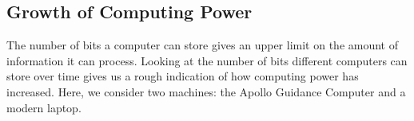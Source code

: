 
\subsection{Growth of Computing Power}\label{sec:growthofcomputing}


The number of bits a computer can store gives an upper limit on the amount of information it can process.  Looking at the number of bits different computers can store over time gives us a rough indication of how computing power has increased.   Here, we consider two machines: the Apollo Guidance Computer and a modern laptop.

